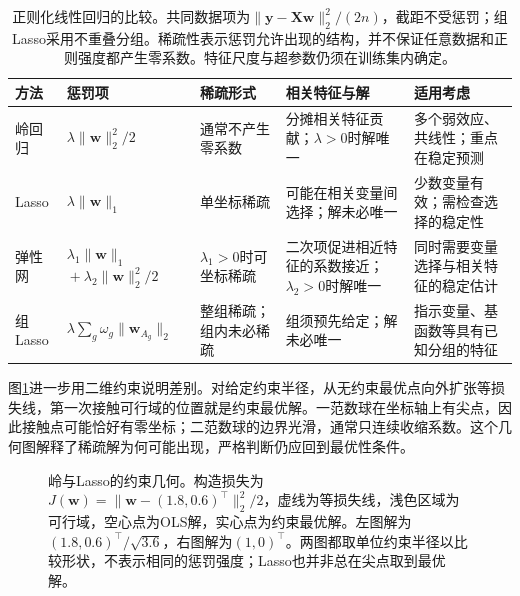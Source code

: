 \begin{table}[t]
  \centering
  \small
  \setlength{\tabcolsep}{4pt}
  \renewcommand{\arraystretch}{1.25}
  \begin{tabularx}{\linewidth}{@{}>{\RaggedRight\arraybackslash}p{16mm}>{\RaggedRight\arraybackslash}p{42mm}>{\RaggedRight\arraybackslash}p{24mm}>{\RaggedRight\arraybackslash}p{34mm}>{\RaggedRight\arraybackslash}X@{}}
    \toprule
    方法 & 惩罚项 & 稀疏形式 & 相关特征与解 & 适用考虑 \\
    \midrule
    岭回归 & $\lambda\lVert\bm{w}\rVert_2^2/2$ & 通常不产生零系数 & 分摊相关特征贡献；$\lambda>0$时解唯一 & 多个弱效应、共线性；重点在稳定预测 \\
    \addlinespace
    Lasso & $\lambda\lVert\bm{w}\rVert_1$ & 单坐标稀疏 & 可能在相关变量间选择；解未必唯一 & 少数变量有效；需检查选择的稳定性 \\
    \addlinespace
    弹性网 & $\lambda_1\lVert\bm{w}\rVert_1$\newline ${}+\lambda_2\lVert\bm{w}\rVert_2^2/2$ & $\lambda_1>0$时可坐标稀疏 & 二次项促进相近特征的系数接近；$\lambda_2>0$时解唯一 & 同时需要变量选择与相关特征的稳定估计 \\
    \addlinespace
    组Lasso & $\lambda\sum_g\omega_g\lVert\bm{w}_{A_g}\rVert_2$ & 整组稀疏；组内未必稀疏 & 组须预先给定；解未必唯一 & 指示变量、基函数等具有已知分组的特征 \\
    \bottomrule
  \end{tabularx}
  \caption{正则化线性回归的比较。共同数据项为$\lVert\bm{y}-\bm{X}\bm{w}\rVert_2^2/(2n)$，截距不受惩罚；组Lasso采用不重叠分组。稀疏性表示惩罚允许出现的结构，并不保证任意数据和正则强度都产生零系数。特征尺度与超参数仍须在训练集内确定。}
  \label{tab:regression-regularization-comparison}
\end{table}

图\ref{fig:regression-regularization-geometry}进一步用二维约束说明差别。对给定约束半径，从无约束最优点向外扩张等损失线，第一次接触可行域的位置就是约束最优解。一范数球在坐标轴上有尖点，因此接触点可能恰好有零坐标；二范数球的边界光滑，通常只连续收缩系数。这个几何图解释了稀疏解为何可能出现，严格判断仍应回到最优性条件。

\begin{figure}[t]
  \centering
  
  \caption{岭与Lasso的约束几何。构造损失为$J(\bm{w})=\lVert\bm{w}-(1.8,0.6)^{\top}\rVert_2^2/2$，虚线为等损失线，浅色区域为可行域，空心点为OLS解，实心点为约束最优解。左图解为$(1.8,0.6)^{\top}/\sqrt{3.6}$，右图解为$(1,0)^{\top}$。两图都取单位约束半径以比较形状，不表示相同的惩罚强度；Lasso也并非总在尖点取到最优解。}
  \label{fig:regression-regularization-geometry}
\end{figure}

